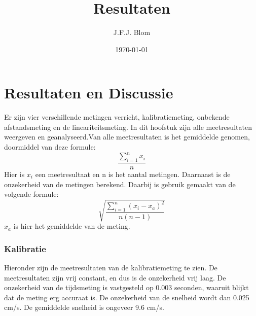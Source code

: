\documentclass{report}
\title{Resultaten}
\author{J.F.J. Blom}
\date{\today}
\begin{document}
\chapter{Resultaten en Discussie}
Er zijn vier verschillende metingen verricht, kalibratiemeting, onbekende afstandsmeting en de lineariteitsmeting. In dit hoofstuk zijn alle meetresultaten weergeven en geanalyseerd.Van alle meetresultaten is het gemiddelde genomen, doormiddel van deze formule:
$$\frac{\sum_{i=1}^{n}x_i}{n}$$
Hier is $x_i$ een meetresultaat en n is het aantal metingen. 
Daarnaast is de onzekerheid van de metingen berekend. Daarbij is gebruik gemaakt van de volgende formule:
$$\sqrt{\frac{\sum_{i=1}^{n}( x_i-x_a)^2}{n(n-1)}}$$
$x_a$ is hier het gemiddelde van de meting.
\subsection*{Kalibratie}
Hieronder zijn de meetresultaten van de kalibratiemeting te zien. De meetresultaten zijn vrij constant, en dus is de onzekerheid vrij laag. De onzekerheid van de tijdsmeting is vastgesteld op 0.003 seconden, waaruit blijkt dat de meting erg accuraat is. De onzekerheid van de snelheid wordt dan 0.025 cm/s. De gemiddelde snelheid is ongeveer 9.6 cm/s.
\end{document}
